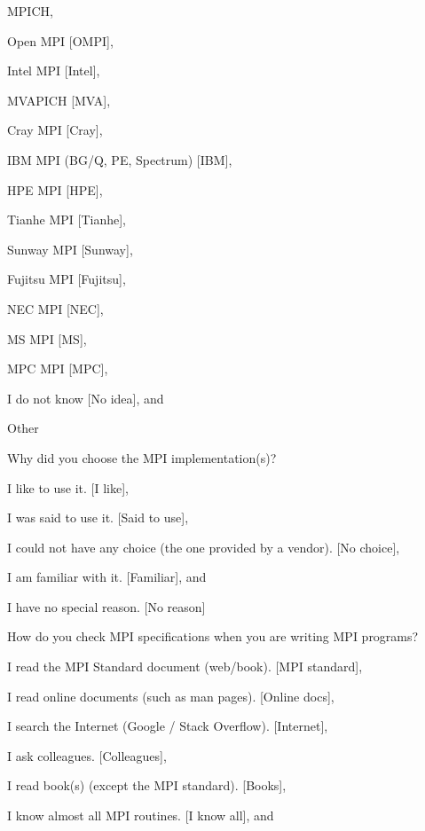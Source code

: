 \documentclass[preprint,5p,times]{elsarticle}
\begin{document}
{{\begin{description}
    \begin{inparaenum}[{\bf C}1)]
    \item MPICH,
    \item Open MPI [OMPI],
    \item Intel MPI [Intel],
    \item MVAPICH [MVA],
    \item Cray MPI [Cray],
    \item IBM MPI (BG/Q, PE, Spectrum) [IBM],
    \item HPE MPI [HPE],
    \item Tianhe MPI [Tianhe],
    \item Sunway MPI [Sunway],
    \item Fujitsu MPI [Fujitsu],
    \item NEC MPI [NEC],
    \item MS MPI [MS],
    \item MPC MPI [MPC],
    \item I do not know [No idea], and
    \item Other
    \end{inparaenum}
  \item[Q13:] Why did you choose the MPI implementation(s)?
    \begin{inparaenum}[{\bf C}1)]
    \item I like to use it. [I like],
    \item I was said to use it. [Said to use],
    \item I could not have any choice (the one provided by a vendor). [No choice],
    \item I am familiar with it. [Familiar], and
    \item I have no special reason. [No reason]
    \end{inparaenum}
  \item[Q14*:] How do you check MPI specifications when you are writing MPI programs?
    \begin{inparaenum}[{\bf C}1)]
    \item I read the MPI Standard document (web/book). [MPI standard],
    \item I read online documents (such as man pages). [Online docs],
    \item I search the Internet (Google / Stack Overflow). [Internet],
    \item I ask colleagues. [Colleagues],
    \item I read book(s) (except the MPI standard). [Books],
    \item I know almost all MPI routines. [I know all], and

\end{inparaenum}
\end{description}}}
\end{document}
